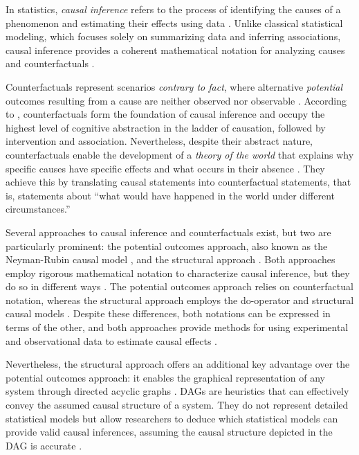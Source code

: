 \documentclass[
  authoryear,
  preprint,
  1p]{elsarticle}
\begin{document}
In statistics, \emph{causal inference} refers to the process of
identifying the causes of a phenomenon and estimating their effects
using data \citep{Shaughnessy_et_al_2010, Neal_2020}. Unlike classical
statistical modeling, which focuses solely on summarizing data and
inferring associations, causal inference provides a coherent
mathematical notation for analyzing causes and counterfactuals
\citep{Pearl_2009}.

Counterfactuals represent scenarios \emph{contrary to fact}, where
alternative \emph{potential} outcomes resulting from a cause are neither
observed nor observable \citep{Neal_2020, Counterfactual_2024}.
According to \citet{Pearl_et_al_2018}, counterfactuals form the
foundation of causal inference and occupy the highest level of cognitive
abstraction in the ladder of causation, followed by intervention and
association. Nevertheless, despite their abstract nature,
counterfactuals enable the development of a \emph{theory of the world}
that explains why specific causes have specific effects and what occurs
in their absence \citep{Pearl_et_al_2018}. They achieve this by
translating causal statements into counterfactual statements, that is,
statements about ``what would have happened in the world under different
circumstances.''

Several approaches to causal inference and counterfactuals exist, but
two are particularly prominent: the potential outcomes approach, also
known as the Neyman-Rubin causal model
\citep{Neyman_et_al_1923, Rubin_1974}, and the structural approach
\citep{Wright_1921, Pearl_2009, Pearl_et_al_2016}. Both approaches
employ rigorous mathematical notation to characterize causal inference,
but they do so in different ways \citep{Neal_2020}. The potential
outcomes approach relies on counterfactual notation, whereas the
structural approach employs the do-operator and structural causal models
\citep[SCM,][]{Pearl_2009, Pearl_et_al_2016}. Despite these differences,
both notations can be expressed in terms of the other, and both
approaches provide methods for using experimental and observational data
to estimate causal effects \citep{Pearl_2010}.

Nevertheless, the structural approach offers an additional key advantage
over the potential outcomes approach: it enables the graphical
representation of any system through directed acyclic graphs
\citep[DAG,][]{Gross_et_al_2018, Neal_2020}. DAGs are heuristics that
can effectively convey the assumed causal structure of a system. They do
not represent detailed statistical models but allow researchers to
deduce which statistical models can provide valid causal inferences,
assuming the causal structure depicted in the DAG is accurate
\citep{McElreath_2020}.
\end{document}

